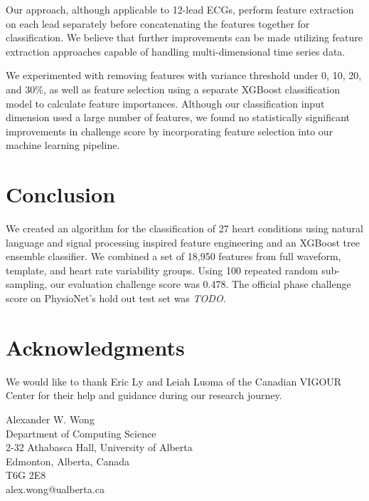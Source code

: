 \documentclass[twocolumn]{cinc}
\begin{document}
Our approach, although applicable to 12-lead ECGs, perform feature extraction on each lead separately before concatenating the features together for classification.
We believe that further improvements can be made utilizing feature extraction approaches capable of handling multi-dimensional time series data.

We experimented with removing features with variance threshold under 0, 10, 20, and 30\%, as well as feature selection using a separate XGBoost classification model to calculate feature importances.
Although our classification input dimension used a large number of features, we found no statistically significant improvements in challenge score by incorporating feature selection into our machine learning pipeline.

\section{Conclusion}

We created an algorithm for the classification of 27 heart conditions using natural language and signal processing inspired feature engineering and an XGBoost tree ensemble classifier.
We combined a set of 18,950 features from full waveform, template, and heart rate variability groups.
Using 100 repeated random sub-sampling, our evaluation challenge score was 0.478.
The official phase challenge score on PhysioNet's hold out test set was \emph{TODO}.


\section*{Acknowledgments}
We would like to thank Eric Ly and Leiah Luoma of the Canadian VIGOUR Center for their help and guidance during our research journey.



\begin{correspondence}
Alexander W. Wong\\
Department of Computing Science\\
2-32 Athabasca Hall, University of Alberta\\
Edmonton, Alberta, Canada\\
T6G 2E8\\
alex.wong@ualberta.ca
\end{correspondence}
\end{document}
